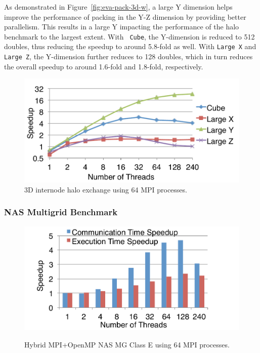 As demonstrated in Figure~\ref{fig:eva-pack-3d-w}, a large Y dimension
helps improve the performance of packing in the Y-Z dimension by
providing better parallelism.  This results in a large Y impacting the
performance of the halo benchmark to the largest extent.  With {\tt
  Cube}, the Y-dimension is reduced to 512 doubles, thus reducing the
speedup to around 5.8-fold as well.  With {\tt Large X} and {\tt Large
  Z}, the Y-dimension further reduces to 128 doubles, which in turn
reduces the overall speedup to around 1.6-fold and 1.8-fold,
respectively.

\begin{figure}
\begin{center}
\includegraphics[width=0.8\columnwidth ]{figures/mtmpi/eva-stp-pack-3dhalo-shapes.pdf}
\vspace{-2.0ex}
\caption{3D internode halo exchange using 64 MPI processes.}
\label{fig:eva-pack-3d-halo-shapes}
\end{center}
\vspace{-5.0ex}
\end{figure}

\subsubsection{NAS Multigrid Benchmark}

\begin{figure}[t]
\begin{center}
\includegraphics[width=0.8\columnwidth ]{figures/mtmpi/eva-stp-pack-mg-speedup-e.pdf}
\vspace{-2.0ex}
\caption{Hybrid MPI+OpenMP NAS MG Class E using 64 MPI processes.}
\vspace{-5.0ex}
\label{fig:eva-stp-pack-mg-sp-e}
\end{center}
\end{figure}

